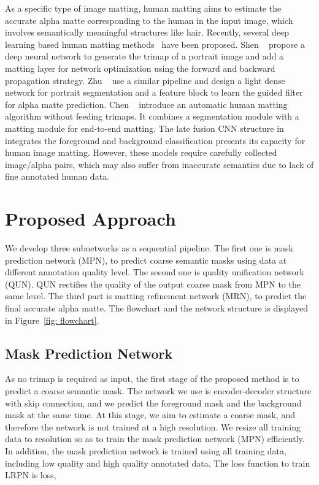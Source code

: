 \documentclass[10pt,twocolumn,letterpaper]{article}
\begin{document}
 As a specific type of image matting, human matting aims to estimate the accurate alpha matte corresponding to the human in the input image, which involves semantically meaningful structures like hair. Recently, several deep learning based human matting methods~\cite{chen2018semantic,shen2016deep,zhu2017fast} have been proposed. Shen \etal~\cite{shen2016deep} propose a deep neural network to generate the trimap of a portrait image and add a matting layer\cite{levin2007closed} for network optimization using the forward and backward propagation strategy. Zhu \etal~\cite{zhu2017fast} use a similar pipeline and design a light dense network for portrait segmentation and a feature block to learn the guided filter~\cite{he2010guided} for alpha matte prediction. Chen \etal~\cite{chen2018semantic} introduce an automatic human matting algorithm without feeding trimaps. It combines a segmentation module with a matting module for end-to-end matting. The late fusion CNN structure in ~\cite{Zhang_2019_CVPR} integrates the foreground and background classification presents its capacity for human image matting. However, these models require carefully collected image/alpha pairs, which may also suffer from inaccurate semantics due to lack of fine annotated human data.


\section{Proposed Approach}


We develop three subnetworks as a sequential pipeline. The first one is mask prediction network (MPN), to predict coarse semantic masks using data at different annotation quality level. The second one is quality unification network (QUN). QUN rectifies the quality of the output coarse mask from MPN to the same level. The third part is matting refinement network (MRN), to predict the final accurate alpha matte. The flowchart and the network structure is displayed in Figure~\ref{fig: flowchart}.

\subsection{Mask Prediction Network}
As no trimap is required as input, the first stage of the proposed method is to predict a coarse semantic mask. The network we use is encoder-decoder structure with skip connection, and we predict the foreground mask and the background mask at the same time. At this stage, we aim to estimate a coarse mask, and therefore the network is not trained at a high resolution. We resize all training data to resolution  so as to train the mask prediction network (MPN) efficiently. In addition, the mask prediction network is trained using all training data, including low quality and high quality annotated data. The loss function to train LRPN is  loss,
\end{document}
